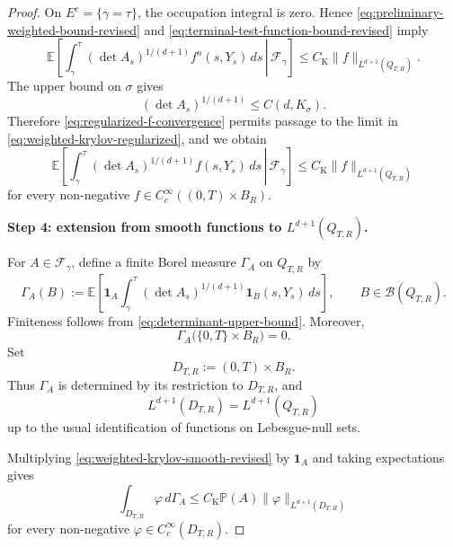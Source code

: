 \documentclass[12pt,oneside, reqno]{amsart}
\numberwithin{equation}{section}
\begin{document}
\begin{proof}
	On \(E^c=\{\gamma=\tau\}\), the occupation integral is zero.
	Hence \eqref{eq:preliminary-weighted-bound-revised} and
	\eqref{eq:terminal-test-function-bound-revised} imply
	\begin{equation}
		\label{eq:weighted-krylov-regularized}
		\mathbb E\left[
		\left.
		\int_\gamma^\tau
		(\det A_s)^{1/(d+1)}
		f^n(s,Y_s)\,ds
		\,\right|\,
		\mathcal F_\gamma
		\right]
		\leq
		C_{\mathrm K}
		\|f\|_{L^{d+1}(Q_{T,R})}.
	\end{equation}
	The upper bound on \(\sigma\) gives
	\begin{equation}
		\label{eq:determinant-upper-bound}
		(\det A_s)^{1/(d+1)}
		\leq
		C(d,K_\sigma).
	\end{equation}
	Therefore \eqref{eq:regularized-f-convergence} permits passage to the
	limit in \eqref{eq:weighted-krylov-regularized}, and we obtain
	\begin{equation}
		\label{eq:weighted-krylov-smooth-revised}
		\mathbb E\left[
		\left.
		\int_\gamma^\tau
		(\det A_s)^{1/(d+1)}
		f(s,Y_s)\,ds
		\,\right|\,
		\mathcal F_\gamma
		\right]
		\leq
		C_{\mathrm K}
		\|f\|_{L^{d+1}(Q_{T,R})}
	\end{equation}
	for every non-negative
	\(f\in C_c^\infty((0,T)\times B_R)\).
	
	
	\textbf{Step 4: extension from smooth functions to	\(L^{d+1}(Q_{T,R})\).}
	
	For \(A\in\mathcal F_\gamma\), define a finite Borel measure	\(\Gamma_A\) on \(Q_{T,R}\) by
	\begin{equation}
		\label{eq:conditional-occupation-measure}
		\Gamma_A(B)	:=
		\mathbb E\left[
		\mathbf1_A
		\int_\gamma^\tau
		(\det A_s)^{1/(d+1)}
		\mathbf1_B(s,Y_s)\,ds
		\right],
		\qquad
		B\in\mathcal B(Q_{T,R}).
	\end{equation}
	Finiteness follows from
	\eqref{eq:determinant-upper-bound}. Moreover,
	\[
	\Gamma_A\bigl(\{0,T\}\times B_R\bigr)=0.
	\]
	Set
	\[
	D_{T,R}:=(0,T)\times B_R.
	\]
	Thus \(\Gamma_A\) is determined by its restriction to \(D_{T,R}\),
	and
	\[
	L^{d+1}(D_{T,R})
	=
	L^{d+1}(Q_{T,R})
	\]
	up to the usual identification of functions on Lebesgue-null sets.
	
	Multiplying \eqref{eq:weighted-krylov-smooth-revised} by
	\(\mathbf1_A\) and taking expectations gives
	\begin{equation}
		\label{eq:occupation-measure-smooth-bound}
		\int_{D_{T,R}}\varphi\,d\Gamma_A
		\leq
		C_{\mathrm K}\mathbb P(A)
		\|\varphi\|_{L^{d+1}(D_{T,R})}
	\end{equation}
	for every non-negative
	\(\varphi\in C_c^\infty(D_{T,R})\).
	

\end{proof}
\end{document}
